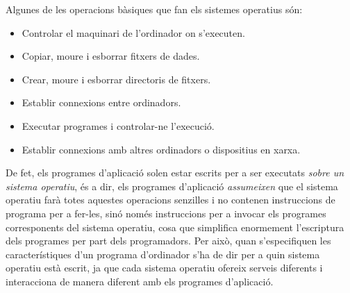 \begin{description}
  Algunes de les operacions bàsiques que fan els sistemes operatius
  són:
  \begin{itemize}
  \item Controlar el maquinari de l'ordinador on s'executen.
  \item Copiar, moure i esborrar fitxers de dades.
  \item Crear, moure i esborrar directoris de fitxers.
  \item Establir connexions entre ordinadors.
  \item Executar programes i controlar-ne l'execució.
  \item Establir connexions amb altres ordinadors o dispositius en
    xarxa.
\end{itemize}
De fet, els programes d'aplicació solen estar escrits per a ser
executats \emph{sobre un sistema operatiu}, és a dir, els programes
d'aplicació \emph{assumeixen} que el sistema operatiu farà totes
aquestes operacions senzilles i no contenen instruccions de programa
per a fer-les, sinó només instruccions per a invocar els programes
corresponents del sistema operatiu, cosa que simplifica enormement
l'escriptura dels programes per part dels programadors.  Per això,
quan s'especifiquen les característiques d'un programa d'ordinador
s'ha de dir per a quin sistema operatiu està escrit, ja que cada
sistema operatiu ofereix serveis diferents i interacciona de manera
diferent amb els programes d'aplicació.%


\end{description}
